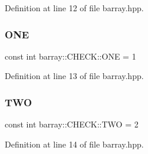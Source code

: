 Definition at line 12 of file barray.\+hpp.

\mbox{\label{namespacebarray_1_1_c_h_e_c_k_a2af137b83f5e63312e153d4aca303e1c}} 
\subsubsection{\texorpdfstring{O\+NE}{ONE}}
{\footnotesize\ttfamily const int barray\+::\+C\+H\+E\+C\+K\+::\+O\+NE = 1}



Definition at line 13 of file barray.\+hpp.

\mbox{\label{namespacebarray_1_1_c_h_e_c_k_a1d786f922bc95bbff0bd33a5ba0e04d3}} 
\subsubsection{\texorpdfstring{T\+WO}{TWO}}
{\footnotesize\ttfamily const int barray\+::\+C\+H\+E\+C\+K\+::\+T\+WO = 2}



Definition at line 14 of file barray.\+hpp.

